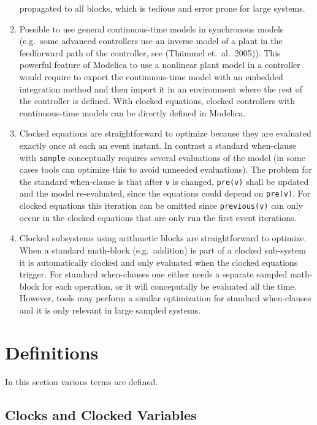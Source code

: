 \begin{nonnormative}
\begin{enumerate}
  propagated to all blocks, which is tedious and error prone for large systems.
\item
  Possible to use general continuous-time models in synchronous models
  (e.g.\ some advanced controllers use an inverse model of a
  plant in the feedforward path of the controller, see (Thümmel et.~al.\ 2005)).
  This powerful feature of Modelica to use a nonlinear plant
  model in a controller would require to export the continuous-time
  model with an embedded integration method and then import it in an
  environment where the rest of the controller is defined. With clocked
  equations, clocked controllers with continuous-time models can be
  directly defined in Modelica.
\item
  Clocked equations are straightforward to optimize because they are
  evaluated exactly once at each an event instant.
  In contrast a standard when-clause with \lstinline!sample! conceptually
  requires several evaluations of the model (in some cases tools
  can optimize this to avoid unneeded evaluations).
  The problem for the standard when-clause is that after \lstinline!v!
  is changed, \lstinline!pre(v)! shall be updated and the model re-evaluated,
  since the equations could depend on \lstinline!pre(v)!.
  For clocked equations this iteration can be omitted
  since \lstinline!previous(v)! can only occur in the clocked equations
  that are only run the first event iterations.
\item
  Clocked subsystems using arithmetic blocks are straightforward to optimize.
  When a standard math-block (e.g.\ addition) is part of a clocked sub-system it is automatically
  clocked and only evaluated when the clocked equations trigger.
  For standard when-clauses one either needs a separate sampled math-block for each operation, or
  it will conceputally be evaluated all the time.
  However, tools may perform a similar optimization for standard when-clauses
  and it is only relevant in large sampled systems.
\end{enumerate}
\end{nonnormative}

\section{Definitions}\label{definitions}

In this section various terms are defined.

\subsection{Clocks and Clocked Variables}\label{clocks-and-clocked-variables}


